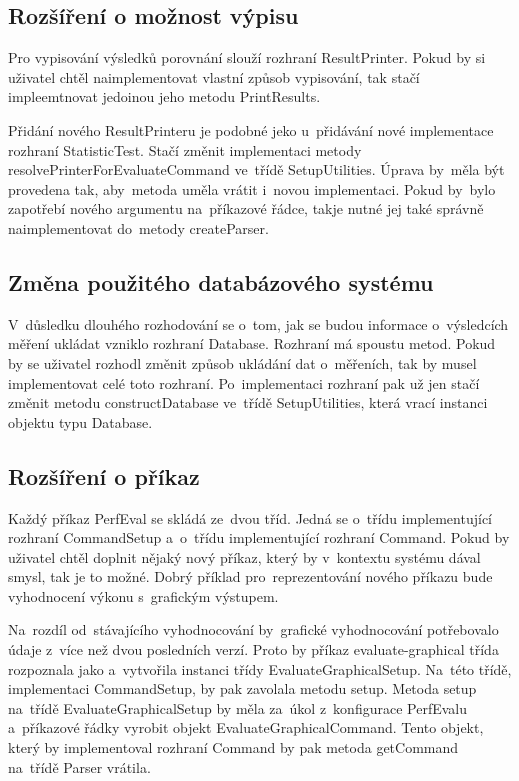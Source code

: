 \subsection{Rozšíření o možnost výpisu}

Pro vypisování výsledků porovnání slouží rozhraní ResultPrinter. Pokud by si uživatel chtěl naimplementovat
vlastní způsob vypisování, tak stačí impleemtnovat jedoinou jeho metodu PrintResults.

Přidání nového ResultPrinteru je podobné jeko u~přidávání nové implementace rozhraní StatisticTest.
Stačí změnit implementaci metody resolvePrinterForEvaluateCommand ve~třídě SetupUtilities.
Úprava by~měla být provedena tak, aby~metoda uměla vrátit i~novou implementaci.
Pokud by~bylo zapotřebí nového argumentu na~příkazové řádce, takje nutné jej také
správně naimplementovat do~metody createParser.

\subsection{Změna použitého databázového systému}

V~důsledku dlouhého rozhodování se o~tom, jak se budou informace o~výsledcích měření ukládat vzniklo rozhraní Database.
Rozhraní má spoustu metod. Pokud by se uživatel rozhodl změnit způsob ukládání dat o~měřeních, tak by
musel implementovat celé toto rozhraní. Po~implementaci rozhraní pak už jen stačí změnit metodu constructDatabase ve~třídě
SetupUtilities, která vrací instanci objektu typu Database.

\subsection{Rozšíření o příkaz}

Každý příkaz PerfEval se skládá ze~dvou tříd. Jedná se o~třídu implementující rozhraní CommandSetup
a~o~třídu implementující rozhraní Command. Pokud by uživatel chtěl doplnit nějaký nový příkaz,
který by v~kontextu systému dával smysl, tak je to možné. Dobrý příklad pro~reprezentování nového příkazu
bude vyhodnocení výkonu s~grafickým výstupem.

Na~rozdíl od~stávajícího vyhodnocování by~grafické vyhodnocování potřebovalo údaje z~více než dvou posledních verzí.
Proto by příkaz evaluate-graphical třída rozpoznala jako a~vytvořila instanci třídy EvaluateGraphicalSetup.
Na~této třídě, implementaci CommandSetup, by pak zavolala metodu setup. Metoda setup na~třídě EvaluateGraphicalSetup
by měla za~úkol z~konfigurace PerfEvalu a~příkazové řádky vyrobit objekt EvaluateGraphicalCommand. Tento objekt, který
by implementoval rozhraní Command by pak metoda getCommand na~třídě Parser vrátila.


